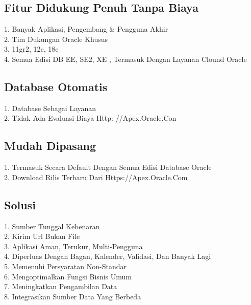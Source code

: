 \documentclass{article}
\begin{document}
\subsection{Fitur Didukung Penuh Tanpa Biaya}
1.	Banyak Aplikasi, Pengembang & Pengguna Akhir\\
2.	Tim Dukungan Oracle Khusus\\
3.	11gr2, 12c, 18c\\
4.	Semua Edisi DB EE, SE2, XE , Termasuk Dengan Layanan Clound Oracle\\

\subsection{Database Otomatis}
1.	Database Sebagai Layanan\\
2.	Tidak Ada Evaluasi Biaya Http: //Apex.Oracle.Con\\

\subsection{Mudah Dipasang}
1.	Termasuk Secara Default Dengan Semua Edisi Database Oracle\\
2.	Download Rilis Terbaru Dari Https://Apex.Oracle.Com\\

\subsection{Solusi}
1.	Sumber Tunggal Kebenaran\\
2.	Kirim Url Bukan File\\
3.	Aplikasi Aman, Terukur, Multi-Pengguna\\
4.	Diperluas Dengan Bagan, Kalender, Validasi, Dan Banyak Lagi\\
5.	 Memenuhi Persyaratan Non-Standar\\
6.	 Mengoptimalkan Fungsi Bisnis Umum\\
7.	 Meningkatkan Pengambilan Data\\
8.	Integrasikan Sumber Data Yang Berbeda\\
\end{document}
